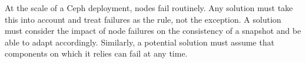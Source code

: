 At the scale of a Ceph deployment, nodes fail routinely. Any
solution must take this into account and treat failures as the rule,
not the exception. A solution must consider the impact of node
failures on the consistency of a snapshot and be able to adapt
accordingly. Similarly, a potential solution must assume that
components on which it relies can fail at any time.
